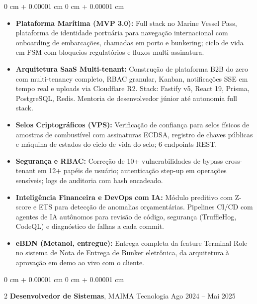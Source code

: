 \documentclass[10pt, letterpaper]{article}
\newenvironment{highlights}{ \begin{itemize}[ topsep=0.10 cm, parsep=0.10 cm, partopsep=0pt,
itemsep=0pt, leftmargin=0 cm + 10pt ] }{ \end{itemize} } %
\newenvironment{onecolentry}{ \begin{adjustwidth}{ 0 cm + 0.00001 cm }{ 0 cm + 0.00001 cm }
}{ \end{adjustwidth} } %
\newenvironment{twocolentry}[2][]{ \onecolentry \def\secondColumn{#2} \setcolumnwidth{\fill, 4.5 cm}
\begin{paracol}{2} }{ \switchcolumn \raggedleft \secondColumn \end{paracol}
\endonecolentry } %
\begin{document}
	\vspace{0.10 cm}
	\begin{onecolentry}
		\begin{highlights}
			\item \textbf{Plataforma Mar\'itima (MVP 3.0):} Full stack no Marine Vessel Pass, plataforma de identidade portu\'aria para navega\c{c}\~ao internacional com onboarding de embarca\c{c}\~oes, chamadas em porto e bunkering; ciclo de vida em FSM com bloqueios regulat\'orios e fluxos multi-assinatura.
            \item \textbf{Arquitetura SaaS Multi-tenant:} Constru\c{c}\~ao de plataforma B2B do zero com multi-tenancy completo, RBAC granular, Kanban, notifica\c{c}\~oes SSE em tempo real e uploads via Cloudflare R2. Stack: Fastify v5, React 19, Prisma, PostgreSQL, Redis. Mentoria de desenvolvedor j\'unior at\'e autonomia full stack.
            \item \textbf{Selos Criptogr\'aficos (VPS):} Verifica\c{c}\~ao de confian\c{c}a para selos f\'isicos de amostras de combust\'ivel com assinaturas ECDSA, registro de chaves p\'ublicas e m\'aquina de estados do ciclo de vida do selo; 6 endpoints REST.
            \item \textbf{Seguran\c{c}a e RBAC:} Corre\c{c}\~ao de 10+ vulnerabilidades de bypass cross-tenant em 12+ pap\'eis de usu\'ario; autentica\c{c}\~ao step-up em opera\c{c}\~oes sens\'iveis; logs de auditoria com hash encadeado.
            \item \textbf{Intelig\^encia Financeira e DevOps com IA:} M\'odulo preditivo com Z-score e ETS para detec\c{c}\~ao de anomalias or\c{c}ament\'arias. Pipelines CI/CD com agentes de IA aut\^onomos para revis\~ao de c\'odigo, seguran\c{c}a (TruffleHog, CodeQL) e diagn\'ostico de falhas a cada commit.
			\item \textbf{eBDN (Metanol, entregue):} Entrega completa da feature Terminal Role no sistema de Nota de Entrega de Bunker eletr\^onica, da arquitetura \`a aprova\c{c}\~ao em demo ao vivo com o cliente.
		\end{highlights}
	\end{onecolentry}

	\vspace{0.2 cm}

	\begin{twocolentry}
		{ Ago 2024 -- Mai 2025 } \textbf{Desenvolvedor de Sistemas}, MAIMA Tecnologia
	\end{twocolentry}
\end{document}
